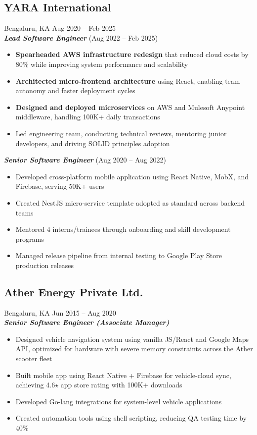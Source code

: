 \documentclass[10pt,a4paper]{article}
\begin{document}
\subsection*{\large YARA International}
\textcolor{datecolor}{Bengaluru, KA \textbar Aug 2020 -- Feb 2025} \\
\textbf{\textit{Lead Software Engineer}} (Aug 2022 -- Feb 2025)

\begin{itemize}[leftmargin=*, nosep]
  \item \textbf{Spearheaded AWS infrastructure redesign} that reduced cloud costs by 80\% while improving system performance and scalability
  \item \textbf{Architected micro-frontend architecture} using React, enabling team autonomy and faster deployment cycles
  \item \textbf{Designed and deployed microservices} on AWS and Mulesoft Anypoint middleware, handling 100K+ daily transactions
  \item Led engineering team, conducting technical reviews, mentoring junior developers, and driving SOLID principles adoption
\end{itemize}

\textbf{\textit{Senior Software Engineer}} (Aug 2020 -- Aug 2022)

\begin{itemize}[leftmargin=*, nosep]
  \item Developed cross-platform mobile application using React Native, MobX, and Firebase, serving 50K+ users
  \item Created NestJS micro-service template adopted as standard across backend teams
  \item Mentored 4 interns/trainees through onboarding and skill development programs
  \item Managed release pipeline from internal testing to Google Play Store production releases
\end{itemize}

\subsection*{\large Ather Energy Private Ltd.}
\textcolor{datecolor}{Bengaluru, KA \textbar Jun 2015 -- Aug 2020} \\
\textbf{\textit{Senior Software Engineer (Associate Manager)}}

\begin{itemize}[leftmargin=*, nosep]
  \item Designed vehicle navigation system using vanilla JS/React and Google Maps API, optimized for hardware with severe memory constraints across the Ather scooter fleet
  \item Built mobile app using React Native + Firebase for vehicle-cloud sync, achieving 4.6$\star$ app store rating with 100K+ downloads
  \item Developed Go-lang integrations for system-level vehicle applications
  \item Created automation tools using shell scripting, reducing QA testing time by 40\%
\end{itemize}
\end{document}
